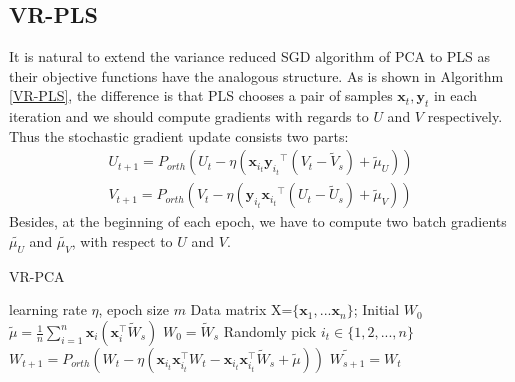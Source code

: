 \documentclass[conference]{IEEEtran}
\begin{document}
 \subsection{VR-PLS}
 It is natural to extend the variance reduced SGD algorithm of PCA to PLS as their objective functions have the analogous structure. As is shown in Algorithm \ref{VR-PLS}, the difference is that PLS chooses a pair of samples $\mathbf{x}_t, \mathbf{y}_t$ in each iteration and we should compute gradients with regards to $U$ and $V$ respectively. Thus the stochastic gradient update consists two parts: 
 \begin{equation}
 \begin{split}
 U_{t+1} = P_{orth}(U_{t} - \eta(\mathbf{x}_{i_t} {\mathbf{y}_{i_t}}^{\top}(V_t - \tilde{V}_s) + \tilde{\mu}_U))\\
 V_{t+1} = P_{orth}(V_{t} - \eta(\mathbf{y}_{i_t} {\mathbf{x}_{i_t}}^{\top}(U_t - \tilde{U}_s) + \tilde{\mu}_V))
 \end{split}
 \end{equation}
 Besides, at the beginning of each epoch, we have to compute two batch gradients $\tilde{\mu_U}$ and $\tilde{\mu_V}$, with respect to $U$ and $V$. 
 
  \begin{algorithm}[t]
 	\caption{\textsc{VR-PCA}}
 	\label{VR-PCA}
	\begin{algorithmic}[1]
	\Require learning rate $\eta$, epoch size $m$
	\Input Data matrix X=$\{\mathbf{x}_1, ... \mathbf{x}_n\}$; Initial $W_0$
		\State $\tilde{\mu} = \frac{1}{n}\sum\limits_{i=1}^{n}\mathbf{x}_{i}(\mathbf{x}_{i}^{\top}\tilde{W}_{s})$
		\State $W_0 = \tilde{W}_s$
			\State Randomly pick $i_t\in\{1, 2, ..., n\}$
			\State $W_{t+1} = P_{orth}(W_{t} - \eta(\mathbf{x}_{i_t}\mathbf{x}_{i_t}^{\top}W_{t}-\mathbf{x}_{i_t}\mathbf{x}_{i_t}^{\top}\tilde{W}_{s}+\tilde{\mu}))$
		\EndFor
		\State $\tilde{W_{s+1}} = W_{t}$
			
	\EndFor
	\end{algorithmic}
\end{algorithm}
 
 
 
\end{document}
